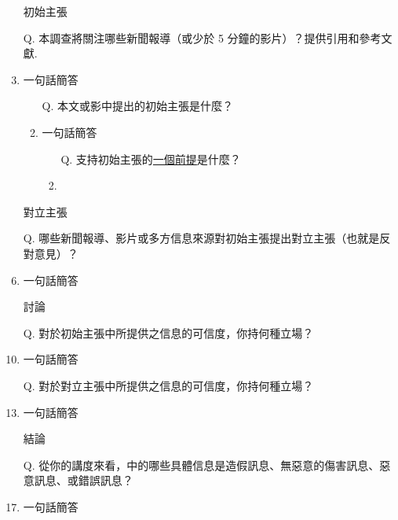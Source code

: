 \documentclass[a4paper, 12pt]{article}
\begin{document}
\begin{CJK}{UTF8}{bkai}
    \begin{enumerate}[I]
        \item[]{\color{blue}初始主張}
        \item[Q.] 本調查將關注哪些新聞報導（或少於 5 分鐘的影片）？提供引用和參考文獻.
        \item 一句話簡答 %
              \begin{enumerate}
                  \item [Q.] 本文或影中提出的{\color{blue}初始主張}是什麼？
                  \item 一句話簡答 %
                        \begin{enumerate}
                            \item[Q.] 支持{\color{blue}初始主張}的{\underline{一個前提}}是什麼？
                            \item
                        \end{enumerate}
              \end{enumerate}
        \item [] {\color{red}對立主張}
        \item[Q.] 哪些新聞報導、影片或多方信息來源對初始主張提出對立主張（也就是反對意見）？
        \item 一句話簡答 %
        \item [] %
        \item [] 討論
        \item [Q.] 對於{\color{blue}初始主張}中所提供之信息的可信度，你持何種立場？
        \item 一句話簡答 %
        \item []
        \item [Q.] 對於{\color{red}對立主張}中所提供之信息的可信度，你持何種立場？
        \item 一句話簡答 %
        \item [] %
        \item [] 結論
        \item [Q.] 從你的講度來看，中的哪些具體信息是造假訊息、無惡意的傷害訊息、惡意訊息、或錯誤訊息？
        \item 一句話簡答 %
    \end{enumerate}




\end{CJK}
\end{document}
